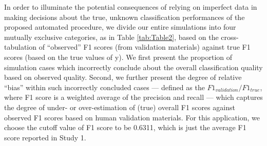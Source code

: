 \documentclass[man, floatsintext, 12pt, a4paper, noextraspace]{apa6}
\begin{document}
    In order to illuminate the potential consequences of relying on imperfect data in making decisions about the true, unknown classification performances of the proposed automated procedure, we divide our entire simulations into four mutually exclusive categories, as in Table \ref{tab:Table2}, based on the cross-tabulation of \enquote{observed} F1 scores (from validation materials) against true F1 scores (based on the true values of y). We first present the proportion of simulation cases which incorrectly conclude about the overall classification quality based on observed quality. Second, we further present the degree of relative \enquote{bias} within such incorrectly concluded cases --- defined as the $ F1_{validation}/F1_{true} $, where F1 score is a weighted average of the precision and recall --- which captures the degree of under- or over-estimation of (true) overall F1 scores against observed F1 scores based on human validation materials. For this application, we choose the cutoff value of F1 score to be 0.6311, which is just the average F1 score reported in Study 1. 
\end{document}

